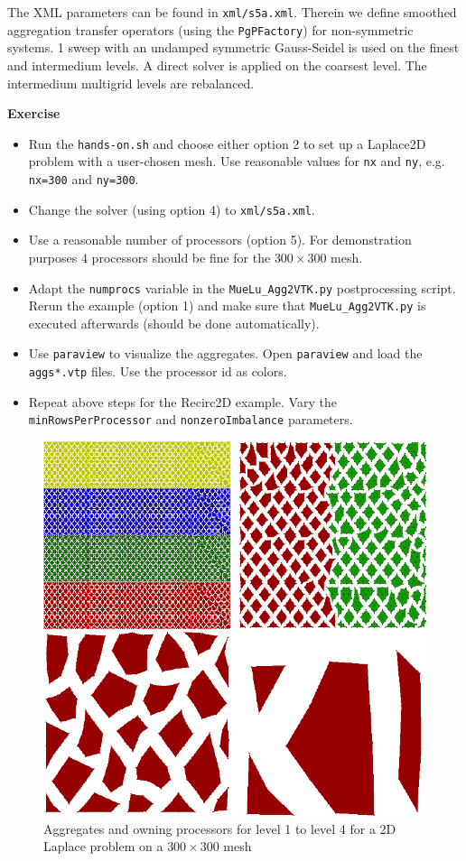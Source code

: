 \documentclass[12pt,a4paper]{article}
\begin{document}
The XML parameters can be found in \verb|xml/s5a.xml|. Therein we define smoothed aggregation transfer operators (using the \verb|PgPFactory|) for non-sym\-metric systems. 1 sweep with an undamped symmetric Gauss-Seidel is used on the finest and intermedium levels. A direct solver is applied on the coarsest level. The intermedium multigrid levels are rebalanced.

\begin{graybox}
 \textbf{Exercise}
 \begin{itemize}
 \item Run the \verb|hands-on.sh| and choose either option 2 to set up a Laplace2D problem with a user-chosen mesh. Use reasonable values for \texttt{nx} and \texttt{ny}, e.g. \verb|nx=300| and \verb|ny=300|.
 \item Change the solver (using option 4) to \verb|xml/s5a.xml|.
 \item Use a reasonable number of processors (option 5). For demonstration purposes $4$ processors should be fine for the $300\times 300$ mesh.
 \item Adapt the \verb|numprocs| variable in the \verb|MueLu_Agg2VTK.py| postprocessing script. Rerun the example (option 1) and make sure that \verb|MueLu_Agg2VTK.py| is executed afterwards (should be done automatically).
 \item Use \verb|paraview| to visualize the aggregates. Open \verb|paraview| and load the \verb|aggs*.vtp| files. Use the processor id as colors.
 \item Repeat above steps for the Recirc2D example. Vary the \verb|minRowsPerProcessor| and \verb|nonzeroImbalance| parameters.
 \end{itemize}
\end{graybox}

\begin{figure}
\includegraphics[width=\textwidth]{images/aggsSymmReb.png}
\caption{Aggregates and owning processors for level 1 to level 4 for a 2D Laplace problem on a $300\times 300$ mesh}
\label{fig:rebAggs}
\end{figure}
\end{document}
